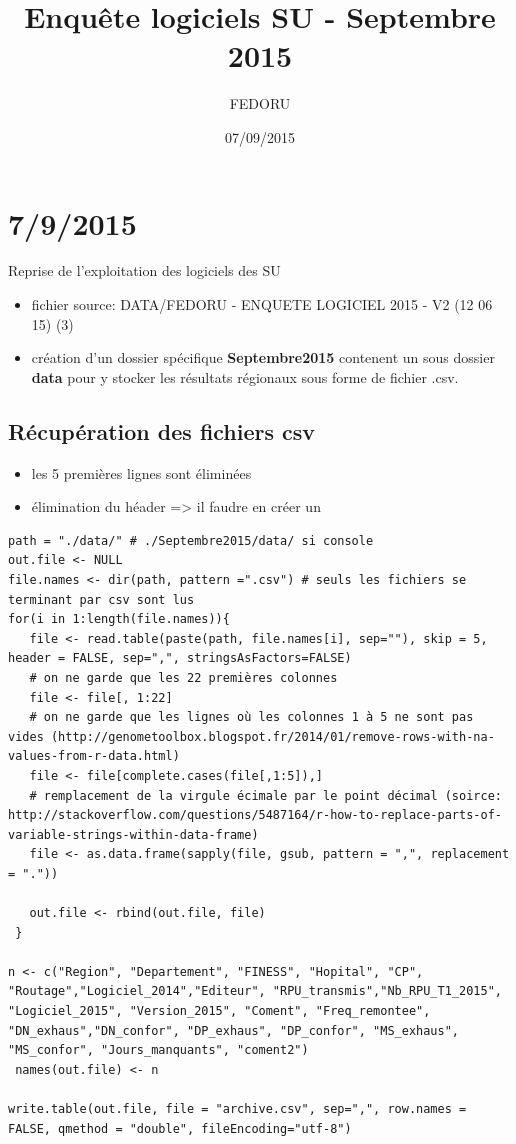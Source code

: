 \documentclass[]{article}
\title{Enquête logiciels SU - Septembre 2015}
\author{FEDORU}
\date{07/09/2015}
\providecommand{\tightlist}{%
  \setlength{\itemsep}{0pt}\setlength{\parskip}{0pt}}
\begin{document}
\maketitle

{
\hypersetup{linkcolor=black}
\setcounter{tocdepth}{2}
\tableofcontents
}
\section{7/9/2015}\label{section}

Reprise de l'exploitation des logiciels des SU

\begin{itemize}
\tightlist
\item
  fichier source: DATA/FEDORU - ENQUETE LOGICIEL 2015 - V2 (12 06 15)
  (3)
\item
  création d'un dossier spécifique \textbf{Septembre2015} contenent un
  sous dossier \textbf{data} pour y stocker les résultats régionaux sous
  forme de fichier .csv.
\end{itemize}

\subsection{Récupération des fichiers
csv}\label{recuperation-des-fichiers-csv}

\begin{itemize}
\tightlist
\item
  les 5 premières lignes sont éliminées
\item
  élimination du héader =\textgreater{} il faudre en créer un
\end{itemize}

\begin{verbatim}
path = "./data/" # ./Septembre2015/data/ si console
out.file <- NULL
file.names <- dir(path, pattern =".csv") # seuls les fichiers se terminant par csv sont lus
for(i in 1:length(file.names)){
   file <- read.table(paste(path, file.names[i], sep=""), skip = 5, header = FALSE, sep=",", stringsAsFactors=FALSE)
   # on ne garde que les 22 premières colonnes
   file <- file[, 1:22]
   # on ne garde que les lignes où les colonnes 1 à 5 ne sont pas vides (http://genometoolbox.blogspot.fr/2014/01/remove-rows-with-na-values-from-r-data.html)
   file <- file[complete.cases(file[,1:5]),]
   # remplacement de la virgule écimale par le point décimal (soirce: http://stackoverflow.com/questions/5487164/r-how-to-replace-parts-of-variable-strings-within-data-frame)
   file <- as.data.frame(sapply(file, gsub, pattern = ",", replacement = "."))

   out.file <- rbind(out.file, file)
 }

n <- c("Region", "Departement", "FINESS", "Hopital", "CP", "Routage","Logiciel_2014","Editeur", "RPU_transmis","Nb_RPU_T1_2015", "Logiciel_2015", "Version_2015", "Coment", "Freq_remontee", "DN_exhaus","DN_confor", "DP_exhaus", "DP_confor", "MS_exhaus", "MS_confor", "Jours_manquants", "coment2")
 names(out.file) <- n

write.table(out.file, file = "archive.csv", sep=",", row.names = FALSE, qmethod = "double", fileEncoding="utf-8")
\end{verbatim}
\end{document}
